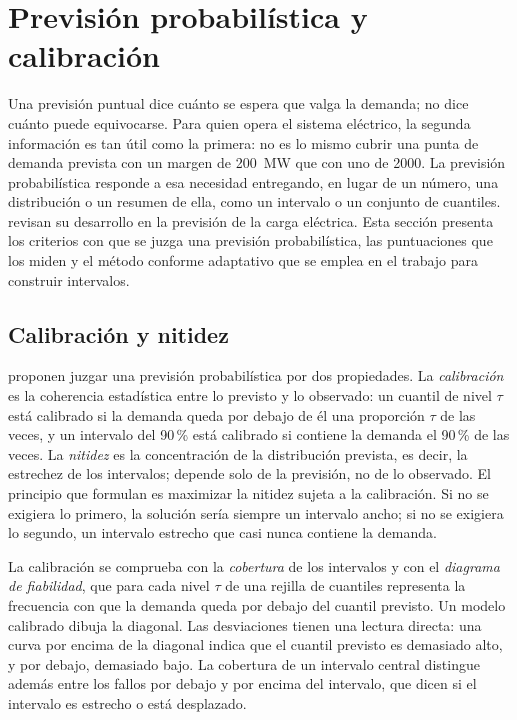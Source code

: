 \section{Previsión probabilística y calibración}\label{sec:probabilistica-teoria}

Una previsión puntual dice cuánto se espera que valga la demanda; no dice
cuánto puede equivocarse. Para quien opera el sistema eléctrico, la segunda
información es tan útil como la primera: no es lo mismo cubrir una punta de
demanda prevista con un margen de 200~MW que con uno de 2000. La previsión
probabilística responde a esa necesidad entregando, en lugar de un número,
una distribución o un resumen de ella, como un intervalo o un conjunto de
cuantiles. \textcite{hong2016probabilistic} revisan su desarrollo en la
previsión de la carga eléctrica. Esta sección presenta los criterios con que se
juzga una previsión probabilística, las puntuaciones que los miden y el método
conforme adaptativo que se emplea en el trabajo para construir intervalos.

\subsection{Calibración y nitidez}\label{sec:calibracion-nitidez}

\textcite{gneiting2007probabilistic} proponen juzgar una previsión
probabilística por dos propiedades. La \emph{calibración} es la coherencia
estadística entre lo previsto y lo observado: un cuantil de nivel $\tau$ está
calibrado si la demanda queda por debajo de él una proporción $\tau$ de las
veces, y un intervalo del 90\,\% está calibrado si contiene la demanda el
90\,\% de las veces. La \emph{nitidez} es la concentración de la distribución
prevista, es decir, la estrechez de los intervalos; depende solo de la
previsión, no de lo observado. El principio que formulan es maximizar la
nitidez sujeta a la calibración. Si no se exigiera lo primero, la solución
sería siempre un intervalo ancho; si no se exigiera lo segundo, un intervalo
estrecho que casi nunca contiene la demanda.

La calibración se comprueba con la \emph{cobertura} de los intervalos y con el
\emph{diagrama de fiabilidad}, que para cada nivel $\tau$ de una rejilla de
cuantiles representa la frecuencia con que la demanda queda por debajo del
cuantil previsto. Un modelo calibrado dibuja la diagonal. Las desviaciones
tienen una lectura directa: una curva por encima de la diagonal indica que
el cuantil previsto es demasiado alto, y por debajo, demasiado bajo. La
cobertura de un intervalo central distingue además entre los fallos por
debajo y por encima del intervalo, que dicen si el intervalo es estrecho o
está desplazado.

